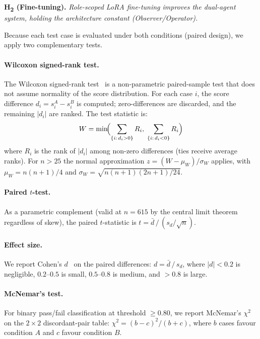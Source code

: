 \noindent\textbf{H\textsubscript{2} (Fine-tuning).} \textit{Role-scoped LoRA fine-tuning improves the dual-agent system, holding the architecture constant (Observer/Operator).}

\medskip
Because each test case is evaluated under both conditions (paired design), we apply two complementary tests.

\paragraph{Wilcoxon signed-rank test.}
The Wilcoxon signed-rank test~\cite{wilcoxon1945individual} is a non-parametric paired-sample test that does not assume normality of the score distribution. For each case $i$, the score difference $d_i = s_i^{A} - s_i^{B}$ is computed; zero-differences are discarded, and the remaining $|d_i|$ are ranked. The test statistic is:
\begin{equation}
    W = \min\!\Bigl(\sum_{\{i:\,d_i>0\}} R_i,\;\sum_{\{i:\,d_i<0\}} R_i\Bigr)
    \label{eq:wilcoxon}
\end{equation}
where $R_i$ is the rank of $|d_i|$ among non-zero differences (ties receive average ranks). For $n > 25$ the normal approximation $z = (W - \mu_W)/\sigma_W$ applies, with $\mu_W = n(n+1)/4$ and $\sigma_W = \sqrt{n(n+1)(2n+1)/24}$.

\paragraph{Paired $t$-test.}
As a parametric complement (valid at $n=615$ by the central limit theorem regardless of skew), the paired $t$-statistic is $t = \bar{d}\,/\,(s_d / \sqrt{n})$.

\paragraph{Effect size.}
We report Cohen's $d$~\cite{cohen1988statistical} on the paired differences: $d = \bar{d}\,/\,s_d$, where $|d| < 0.2$ is negligible, $0.2$--$0.5$ is small, $0.5$--$0.8$ is medium, and $> 0.8$ is large.

\paragraph{McNemar's test.}
For binary pass/fail classification at threshold $\geq 0.80$, we report McNemar's $\chi^{2}$~\cite{mcnemar1947note} on the $2\!\times\!2$ discordant-pair table: $\chi^2 = (b - c)^{2}/(b + c)$, where $b$ cases favour condition $A$ and $c$ favour condition $B$.

